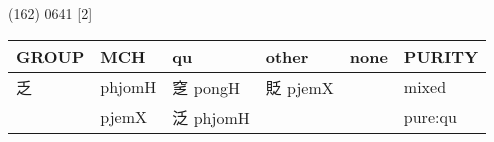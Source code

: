 \documentclass[14pt,a4paper]{scrartcl}
\begin{document}
(162) 0641 {[}2{]}

\begin{longtable}[c]{@{}llllll@{}}
\toprule
\begin{minipage}[b]{0.14\columnwidth}\raggedright\strut
GROUP
\strut\end{minipage} &
\begin{minipage}[b]{0.14\columnwidth}\raggedright\strut
MCH
\strut\end{minipage} &
\begin{minipage}[b]{0.14\columnwidth}\raggedright\strut
qu
\strut\end{minipage} &
\begin{minipage}[b]{0.14\columnwidth}\raggedright\strut
other
\strut\end{minipage} &
\begin{minipage}[b]{0.14\columnwidth}\raggedright\strut
none
\strut\end{minipage} &
\begin{minipage}[b]{0.14\columnwidth}\raggedright\strut
PURITY
\strut\end{minipage}\tabularnewline
\midrule
\endhead
\begin{minipage}[t]{0.14\columnwidth}\raggedright\strut
乏
\strut\end{minipage} &
\begin{minipage}[t]{0.14\columnwidth}\raggedright\strut
phjomH
\strut\end{minipage} &
\begin{minipage}[t]{0.14\columnwidth}\raggedright\strut
窆 pongH
\strut\end{minipage} &
\begin{minipage}[t]{0.14\columnwidth}\raggedright\strut
貶 pjemX
\strut\end{minipage} &
\begin{minipage}[t]{0.14\columnwidth}\raggedright\strut
\strut\end{minipage} &
\begin{minipage}[t]{0.14\columnwidth}\raggedright\strut
mixed
\strut\end{minipage}\tabularnewline
\begin{minipage}[t]{0.14\columnwidth}\raggedright\strut
𢎘
\strut\end{minipage} &
\begin{minipage}[t]{0.14\columnwidth}\raggedright\strut
pjemX
\strut\end{minipage} &
\begin{minipage}[t]{0.14\columnwidth}\raggedright\strut
泛 phjomH
\strut\end{minipage} &
\begin{minipage}[t]{0.14\columnwidth}\raggedright\strut
\strut\end{minipage} &
\begin{minipage}[t]{0.14\columnwidth}\raggedright\strut
\strut\end{minipage} &
\begin{minipage}[t]{0.14\columnwidth}\raggedright\strut
pure:qu
\strut\end{minipage}\tabularnewline
\bottomrule
\end{longtable}
\end{document}
